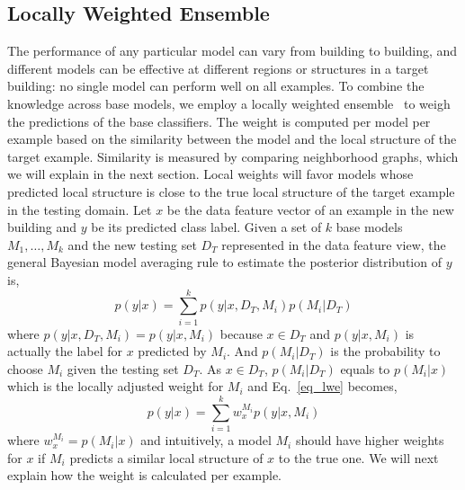 \subsection{Locally Weighted Ensemble}
The performance of any particular model can vary from building to building, and different models can be effective at different regions or structures in a target building: no single model can perform well on all examples. 
To combine the knowledge across base models,  %
we employ a locally weighted ensemble~\cite{lwe} to weigh the predictions of the base classifiers. 
The weight is computed per model per example based on the similarity between the model and the local structure of the target example. 
Similarity is measured by comparing neighborhood graphs, which we will explain in the next section. 
Local weights will favor models whose predicted local structure is close to the true local structure of the target example in the testing domain. 
Let $x$ be the data feature vector of an example in the new building and $y$ be its predicted class label. Given a set of $k$ base models $M_1, \dots, M_k$ and the new testing set $D_T$ represented in the data feature view, the general Bayesian model averaging rule to estimate the posterior distribution of $y$ is,
\begin{equation}\label{eq_lwe}
p(y|x)=\sum_{i=1}^k p(y|x,D_T,M_i) p(M_i|D_T)
\end{equation}
where $p(y|x,D_T,M_i) = p(y|x,M_i)$ because $x \in D_T$ and $p(y|x,M_i)$ is actually the label for $x$ predicted by $M_i$. And $p(M_i|D_T)$ is the probability to choose $M_i$ given the testing set $D_T$. As $x \in D_T$, $p(M_i|D_T)$ equals to $p(M_i|x)$ which is the locally adjusted weight for $M_i$ and Eq.~\ref{eq_lwe} becomes,
\begin{equation}\label{eq_sum}
p(y|x)=\sum_{i=1}^k w_{x}^{M_i} p(y|x, M_i)
\end{equation}
where $w_{x}^{M_i} = p(M_i|x)$ and intuitively, a model $M_i$ should have higher weights for $x$ if $M_i$ predicts a similar local structure of $x$ to the true one.
We will next explain how the weight is calculated per example.


